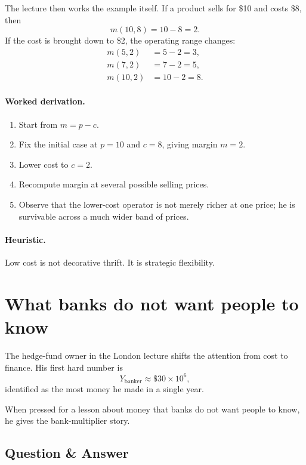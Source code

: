 \documentclass[11pt,oneside]{book}
\begin{document}
The lecture then works the example itself. If a product sells for \$10 and costs \$8, then
\begin{equation}
m(10,8)=10-8=2.
\end{equation}
If the cost is brought down to \$2, the operating range changes:
\begin{align}
m(5,2)&=5-2=3,\\
m(7,2)&=7-2=5,\\
m(10,2)&=10-2=8.
\end{align}

\paragraph{Worked derivation.}
\begin{enumerate}
\item Start from \(m=p-c\).
\item Fix the initial case at \(p=10\) and \(c=8\), giving margin \(m=2\).
\item Lower cost to \(c=2\).
\item Recompute margin at several possible selling prices.
\item Observe that the lower-cost operator is not merely richer at one price; he is survivable across a much wider band of prices.
\end{enumerate}

\paragraph{Heuristic.} Low cost is not decorative thrift. It is strategic flexibility.

\section{What banks do not want people to know}

The hedge-fund owner in the London lecture shifts the attention from cost to finance. His first hard number is
\begin{equation}
Y_{\text{banker}} \approx \$30 \times 10^6,
\end{equation}
identified as the most money he made in a single year.

When pressed for a lesson about money that banks do not want people to know, he gives the bank-multiplier story.

\subsection{Question \& Answer}
\end{document}

